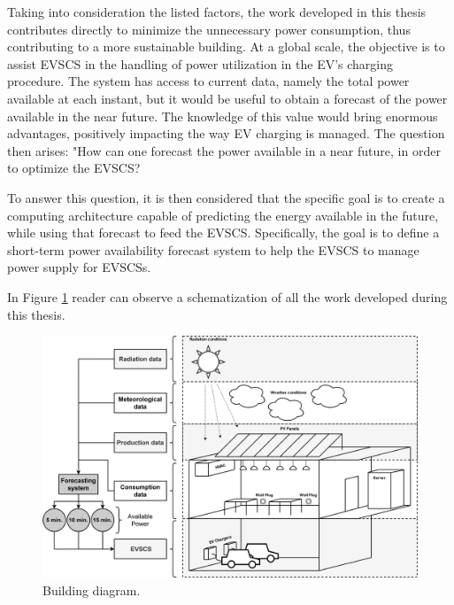 


 
Taking into consideration the listed factors, the work developed in this thesis contributes directly to minimize the unnecessary power consumption, thus contributing to a more sustainable building. At a global scale, the objective is to assist \ac{EVSCS} in the handling of power utilization in the  \ac{EV}'s charging procedure. The system has access to current data, namely the total power available at each instant, but it would be useful to obtain a forecast of the power available in the near future. The knowledge of this value would bring enormous advantages, positively impacting the way \ac{EV} charging is managed. The question then arises: "How can one forecast the power available in a near future, in order to optimize the \ac{EVSCS}?


To answer this question, it is then considered that the specific goal is to create a computing architecture capable of predicting the energy available in the future, while using that forecast to feed the \ac{EVSCS}. Specifically, the goal is to define a short-term power availability forecast system to help the \ac{EVSCS} to manage power supply for \ac{EVSCSs}.


In Figure \ref{building} reader can observe a schematization of all the work developed during this thesis. 

\begin{figure}[h!]
    \centering
    \begin{center}
    \includegraphics[width=1\textwidth]{Images/BUILDING.png}
    \caption{Building diagram.}
    \label{building}
    \end{center}
\end{figure}

